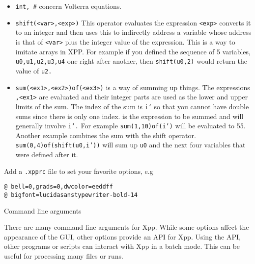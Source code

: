 \begin{itemize}
\item {\tt int, \#} concern Volterra equations.
\item {\tt shift(<var>,<exp>)} This operator evaluates the expression
{\tt <exp>} converts it to an integer and then uses this to indirectly
address a variable whose address is that of {\tt <var>} plus the
integer value of the expression.  This is a way to imitate arrays in
XPP.  For example if you defined the sequence of 5 variables, {\tt
u0,u1,u2,u3,u4} one right after another, then {\tt shift(u0,2)} would
return the value of {\tt u2.} 
\item {\tt sum(<ex1>,<ex2>)of(<ex3>)} is a way of summing up things.
The expressions {\tt <ex1>,<ex1>} are evaluated and their integer
parts are used as the lower and upper limits of the sum.  The index of
the sum is {\tt i'} so that you cannot have double sums since there is
only one index.  {\tt <ex3>} is the expression to be summed and will
generally involve {\tt i'.}  For example  {\tt sum(1,10)of(i')} will
be evaluated to 55.  Another example combines the sum with the shift
operator.  {\tt sum(0,4)of(shift(u0,i'))} will sum up {\tt u0} and the
next four variables that were defined after it.  
\end{itemize}




\medskip
\noindent Add a {\tt .xpprc} file to set your favorite options, e.g
\begin{verbatim}
@ bell=0,grads=0,dwcolor=eeddff
@ bigfont=lucidasanstypewriter-bold-14
\end{verbatim}

\medskip

\begin{center} {\large Command line arguments}\end{center}

\medskip
There are many command line arguments for Xpp.  While some options affect the appearance of the GUI, other options provide an API for Xpp.  Using the API, other programs or scripts can interact with Xpp in a batch mode.  This can be useful for processing many files or runs. 

